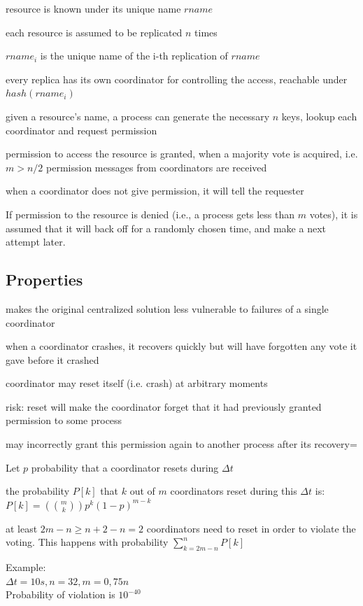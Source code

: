 \documentclass[ngerman,a4paper]{report}
\begin{document}
\begin{compactitem}
	\item resource is known under its unique name $rname$
	\item each resource is assumed to be replicated $n$ times
	\item $rname_i$ is the unique name of the i-th replication of $rname$
	\item every replica has its own coordinator for controlling the access, reachable under $hash(rname_i)$
	\item given a resource's name, a process can generate the necessary $n$ keys, lookup each coordinator and request permission
	\item permission to access the resource is granted, when a majority vote is acquired, i.e. $m>n/2$ permission messages  from  coordinators are received
	\item when a coordinator does not give permission, it will tell the requester
	\item If permission to the resource is denied (i.e., a process gets less than $m$ votes), it is assumed that it will back off for a randomly chosen time, and make a next attempt later.	
\end{compactitem}

\subsection*{Properties}

\begin{compactitem}
	\item makes the original centralized solution less vulnerable to failures of a single coordinator
	\item when a coordinator crashes, it recovers quickly but will have forgotten any vote it gave before it crashed
	\item coordinator may reset itself (i.e. crash) at arbitrary moments
	\item risk: reset will make the coordinator forget that it had previously granted permission to some process 
	\item may incorrectly grant this permission again to another process after its recovery=
	\item Let $p$ probability that a coordinator resets during $\Delta t$
	\item the probability $P[k]$ that $k$ out of $m$ coordinators reset during this $\Delta t$ is:\\
		$P[k]= \left( \binom{m}{k}\right) p^k (1-p)^{m-k}$
	\item at least $2m-n\geq n+2-n=2$ coordinators need to reset in order to violate the voting. This happens with probability $\sum\limits_{k=2m-n}^n P[k]$\\
	\item Example: \\  $\Delta t = 10s, n=32, m=0,75n$ \\ Probability of violation is $10^{-40}$
\end{compactitem}
	
\end{document}
